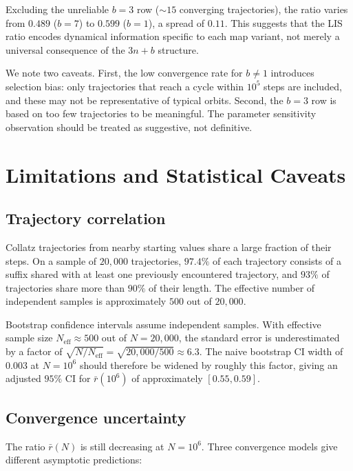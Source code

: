 \documentclass[11pt]{article}
\theoremstyle{definition}
\theoremstyle{remark}
\begin{document}
Excluding the unreliable $b = 3$ row ($\sim\!15$ converging trajectories),
the ratio varies from $0.489$ ($b = 7$) to $0.599$ ($b = 1$), a spread of
$0.11$. This suggests that the LIS ratio encodes dynamical information
specific to each map variant, not merely a universal consequence of the
$3n+b$ structure.

We note two caveats. First, the low convergence rate for $b \neq 1$
introduces selection bias: only trajectories that reach a cycle within
$10^5$ steps are included, and these may not be representative of typical
orbits. Second, the $b = 3$ row is based on too few trajectories to be
meaningful. The parameter sensitivity observation should be treated as
suggestive, not definitive.

\section{Limitations and Statistical Caveats}\label{sec:limitations}

\subsection{Trajectory correlation}\label{sec:correlation}

Collatz trajectories from nearby starting values share a large fraction of
their steps. On a sample of $20{,}000$ trajectories, $97.4\%$ of each
trajectory consists of a suffix shared with at least one previously
encountered trajectory, and $93\%$ of trajectories share more than $90\%$
of their length. The effective number of independent samples is
approximately $500$ out of $20{,}000$.

Bootstrap confidence intervals assume independent samples. With effective
sample size $N_{\mathrm{eff}} \approx 500$ out of $N = 20{,}000$, the
standard error is underestimated by a factor of
$\sqrt{N / N_{\mathrm{eff}}} = \sqrt{20{,}000 / 500} \approx 6.3$.
The naive bootstrap CI width of $0.003$ at $N = 10^6$ should therefore
be widened by roughly this factor, giving an adjusted $95\%$ CI for
$\bar{r}(10^6)$ of approximately $[0.55, 0.59]$.

\subsection{Convergence uncertainty}\label{sec:convergence}

The ratio $\bar{r}(N)$ is still decreasing at $N = 10^6$. Three convergence
models give different asymptotic predictions:
\end{document}
